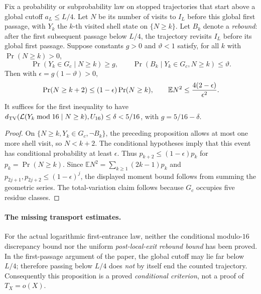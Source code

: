 \begin{proposition}
\label{prop:mod16-transport-candidate}
Fix a probability or subprobability law on stopped trajectories
that start above a global cutoff $a_L\le L/4$. Let $N$ be
its number of visits to $I_L$ before this global first passage,
with $Y_k$ the $k$-th visited shell state on $\{N\ge k\}$.
Let $B_k$ denote a \emph{rebound}: after the first subsequent
passage below $L/4$, the trajectory revisits $I_L$ before
its global first passage. Suppose constants $g>0$ and
$\vartheta<1$ satisfy, for all $k$ with $\Pr(N\ge k)>0$,
\[
 \Pr(Y_k\in G_c\mid N\ge k)\ge g,
 \qquad
 \Pr(B_k\mid Y_k\in G_c,N\ge k)\le\vartheta.
\]
Then with $\epsilon=g(1-\vartheta)>0$,
\[
 \Pr(N\ge k+2)\le(1-\epsilon)\Pr(N\ge k),
 \qquad
 \mathbb E N^2\le {4(2-\epsilon)\over\epsilon^2}.
\]
It suffices for the first inequality to have
$d_{\rm TV}(\mathcal L(Y_k\bmod16\mid N\ge k),U_{16})\le\delta<5/16$,
with $g=5/16-\delta$.
\end{proposition}
\begin{proof}
On $\{N\ge k,Y_k\in G_c,\neg B_k\}$, the preceding
proposition allows at most one more shell visit, so $N<k+2$.
The conditional hypotheses imply that this event has conditional
probability at least $\epsilon$. Thus $p_{k+2}\le(1-\epsilon)p_k$
for $p_k=\Pr(N\ge k)$. Since
$\mathbb E N^2=\sum_{k\ge1}(2k-1)p_k$ and
$p_{2j+1},p_{2j+2}\le(1-\epsilon)^j$, the displayed moment bound
follows from summing the geometric series. The total-variation
claim follows because $G_c$ occupies five residue classes.
\end{proof}

\paragraph{The missing transport estimates.}
For the actual logarithmic first-entrance law, neither the
conditional modulo-$16$ discrepancy bound nor the uniform
\emph{post-local-exit rebound bound} has been proved. In the
first-passage argument of the paper, the global cutoff may lie
far below $L/4$; therefore passing below $L/4$ does \emph{not}
by itself end the counted trajectory. Consequently this
proposition is a proved \emph{conditional criterion}, not a
proof of $T_X=o(X)$.

